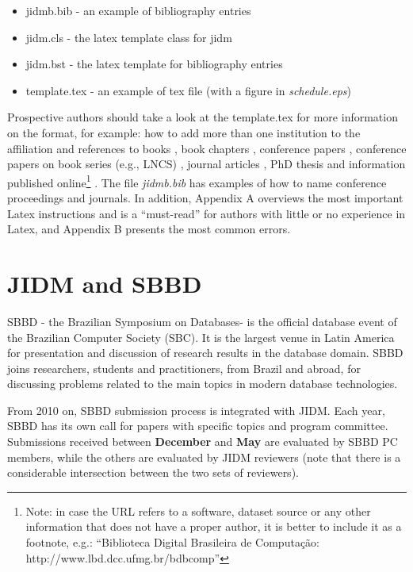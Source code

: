 \documentclass[jidm,a4paper]{jidm} %
\begin{document}
\begin{itemize}
	\item jidmb.bib - an example of bibliography entries
	\item jidm.cls - the latex template class for jidm
	\item jidm.bst - the latex template for bibliography entries
	\item template.tex - an example of tex file (with a figure in \textit{schedule.eps})
\end{itemize}

Prospective authors should take a look at the template.tex for more information on the format, for example: how to add more than one institution to the affiliation and  references to books \cite{Baeza-YatesR99}, book chapters \cite{BorgidaCL09}, conference papers \cite{FerreiraGALV09}, conference papers on book series (e.g., LNCS) \cite{SilvaLC96}, journal articles \cite{LaenderMNM09}, PhD thesis \cite{Moro07} and information published online\footnote{Note: in case the URL refers to a software, dataset source or any other information that does not have a proper author, it is better to include it as a footnote, e.g.: ``Biblioteca Digital Brasileira de Computa\c{c}\~{a}o: http://www.lbd.dcc.ufmg.br/bdbcomp''} \cite{xpath}. The file \textit{jidmb.bib} has examples of how to name conference proceedings and journals. In addition, Appendix A overviews the most important Latex instructions and is a ``must-read'' for authors with little or no experience in Latex, and Appendix B presents the most common errors.

\section{JIDM and SBBD}

SBBD - the Brazilian Symposium on Databases- is the official database event of the Brazilian Computer Society (SBC). It is the largest venue in Latin America for presentation and discussion of research results in the database domain. SBBD joins researchers, students and practitioners, from Brazil and abroad, for discussing problems related to the main topics in modern database technologies. 

From 2010 on, SBBD submission process is integrated with JIDM. %
Each year, SBBD has its own call for papers with specific topics and program committee. Submissions received between \textbf{December} and \textbf{May} are evaluated by SBBD PC members, while the others are evaluated by JIDM reviewers (note that there is a considerable intersection between the two sets of reviewers).
\end{document}
